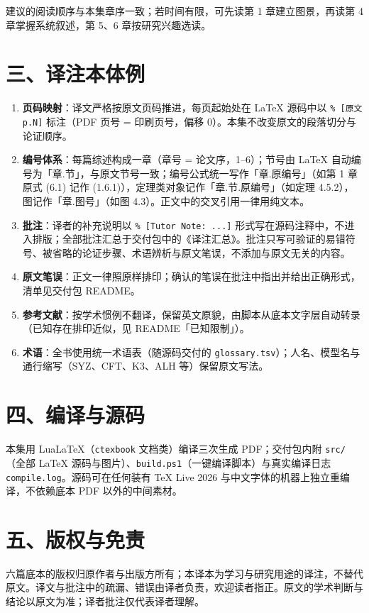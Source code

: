 建议的阅读顺序与本集章序一致；若时间有限，可先读第 1 章建立图景，再读第 4 章掌握系统叙述，第 5、6 章按研究兴趣选读。

\section*{三、译注本体例}

\begin{enumerate}
  \item \textbf{页码映射}：译文严格按原文页码推进，每页起始处在 LaTeX 源码中以 \texttt{\% [原文 p.N]} 标注（PDF 页号 = 印刷页号，偏移 0）。本集不改变原文的段落切分与论证顺序。
  \item \textbf{编号体系}：每篇综述构成一章（章号 = 论文序，1--6）；节号由 \LaTeX{} 自动编号为「章.节」，与原文节号一致；编号公式统一写作「章.原编号」（如第 1 章原式 (6.1) 记作 (1.6.1)），定理类对象记作「章.节.原编号」（如定理 4.5.2），图记作「章.图号」（如图 4.3）。正文中的交叉引用一律用纯文本。
  \item \textbf{批注}：译者的补充说明以 \texttt{\% [Tutor Note: ...]} 形式写在源码注释中，不进入排版；全部批注汇总于交付包中的《译注汇总》。批注只写可验证的易错符号、被省略的论证步骤、术语辨析与原文笔误，不添加与原文无关的内容。
  \item \textbf{原文笔误}：正文一律照原样排印；确认的笔误在批注中指出并给出正确形式，清单见交付包 README。
  \item \textbf{参考文献}：按学术惯例不翻译，保留英文原貌，由脚本从底本文字层自动转录（已知存在排印近似，见 README「已知限制」）。
  \item \textbf{术语}：全书使用统一术语表（随源码交付的 \texttt{glossary.tsv}）；人名、模型名与通行缩写（SYZ、CFT、K3、ALH 等）保留原文写法。
\end{enumerate}

\section*{四、编译与源码}

本集用 Lua\LaTeX{}（\texttt{ctexbook} 文档类）编译三次生成 PDF；交付包内附 \texttt{src/}（全部 \LaTeX{} 源码与图片）、\texttt{build.ps1}（一键编译脚本）与真实编译日志 \texttt{compile.log}。源码可在任何装有 TeX Live 2026 与中文字体的机器上独立重编译，不依赖底本 PDF 以外的中间素材。

\section*{五、版权与免责}

六篇底本的版权归原作者与出版方所有；本译本为学习与研究用途的译注，不替代原文。译文与批注中的疏漏、错误由译者负责，欢迎读者指正。原文的学术判断与结论以原文为准；译者批注仅代表译者理解。
